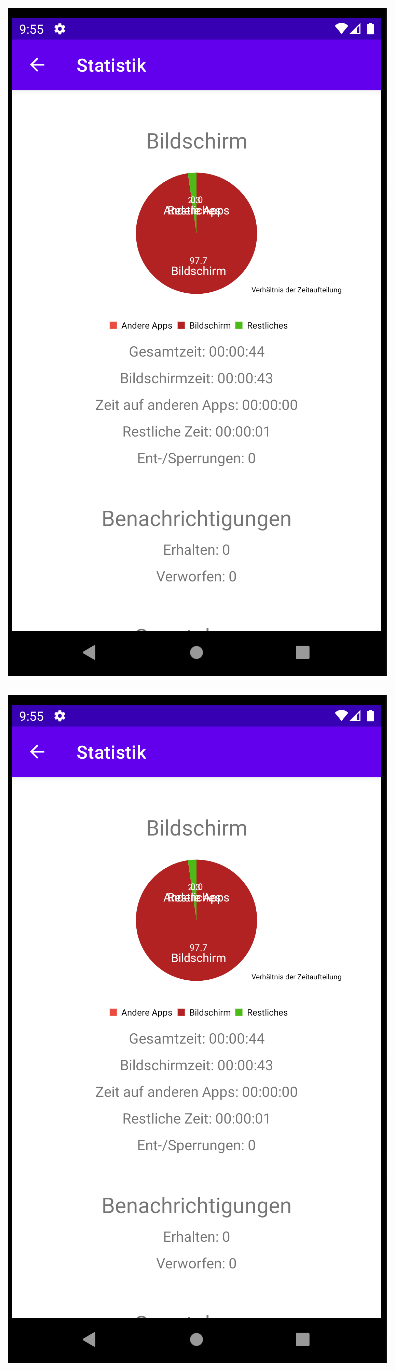 \documentclass{article}
\begin{document}
\begin{center}
    \includegraphics[scale=0.45]{stats_complete_1.png}
\end{center}
\begin{center}
    \includegraphics[scale=0.45]{stats_complete_1.png}
\end{center}
\end{document}

